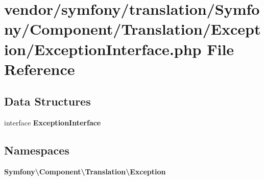 \section{vendor/symfony/translation/\+Symfony/\+Component/\+Translation/\+Exception/\+Exception\+Interface.php File Reference}
\label{symfony_2translation_2_symfony_2_component_2_translation_2_exception_2_exception_interface_8php}
\subsection*{Data Structures}
\begin{DoxyCompactItemize}
\item 
interface {\bf Exception\+Interface}
\end{DoxyCompactItemize}
\subsection*{Namespaces}
\begin{DoxyCompactItemize}
\item 
 {\bf Symfony\textbackslash{}\+Component\textbackslash{}\+Translation\textbackslash{}\+Exception}
\end{DoxyCompactItemize}
